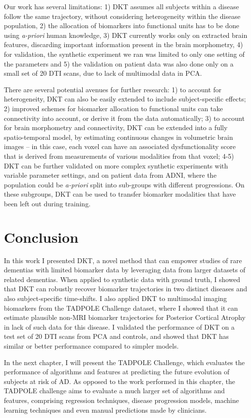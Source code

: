 Our work has several limitations: 1) DKT assumes all subjects within a disease follow the same trajectory, without considering heterogeneity within the disease population, 2) the allocation of biomarkers into functional units has to be done using \emph{a-priori} human knowledge, 3) DKT currently works only on extracted brain features, discarding important information present in the brain morphometry, 4) for validation, the synthetic experiment we ran was limited to only one setting of the parameters and 5) the validation on patient data was also done only on a small set of 20 DTI scans, due to lack of multimodal data in PCA.

There are several potential avenues for further research: 1) to account for heterogeneity, DKT can also be easily extended to include subject-specific effects; 2) improved schemes for biomarker allocation to functional units can take connectivity into account, or derive it from the data automatically; 3) to account for brain morphometry and connectivity, DKT can be extended into a fully spatio-temporal model, by estimating continuous changes in volumetric brain images -- in this case, each voxel can have an associated dysfunctionality score that is derived from measurements of various modalities from that voxel; 4-5) DKT can be further validated on more complex synthetic experiments with variable parameter settings, and on patient data from ADNI, where the population could be \emph{a-priori} split into sub-groups with different progressions. On these subgroups, DKT can be used to transfer biomarker modalities that have been left out during training.



\section{Conclusion}
\label{sec:dktCon}

In this work I presented DKT, a novel method that can empower studies of rare dementias with limited biomarker data by leveraging data from larger datasets of related dementias. When applied to synthetic data with ground truth, I showed that DKT can robustly recover biomarker trajectories in two distinct diseases and also subject-specific time-shifts. I also applied DKT to multimodal imaging biomarkers from the TADPOLE Challenge dataset, where I showed that it can estimate plausible non-MRI biomarker trajectories for Posterior Cortical Atrophy in lack of such data for this disease. I validated the performance of DKT on a test set of 20 DTI scans from PCA and controls, and showed that DKT has similar or better performance compared to simpler models.

In the next chapter, I will present the TADPOLE  Challenge, which evaluates the performance of algorithms and features at predicting the future evolution of subjects at risk of AD. As opposed to the work performed in this chapter, the TADPOLE challenge aims to evaluate a much larger set of algorithms and features, comprising regression techniques, disease progression models, machine learning techniques and even manual predictions made by clinicians.
